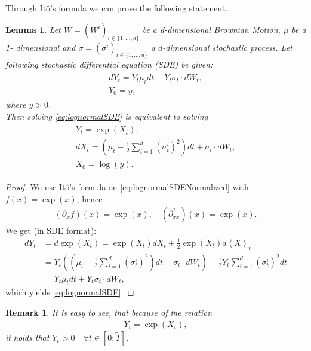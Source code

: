 \documentclass[12pt]{article}
\newtheorem{lemma}[theorem]{Lemma}
\newtheorem{remark}[theorem]{Remark}
\begin{document}
	Through Itô's formula we can prove the following statement.
	\begin{lemma}\label{lm:logNormalDyn}
		Let $W=(W^i)_{i\in \{1, ..., d\}}$ be a d-dimensional Brownian Motion, $\mu$ be a 1- dimensional and $\sigma = (\sigma^i)_{i\in \{1, ..., d\}}$ a $d$-dimensional stochastic process. Let following stochastic differential equation (SDE) be given:
		\begin{align}\label{eq:lognormalSDE}
			\begin{aligned}
				dY_t = Y_t \mu_t dt + Y_t \sigma_t \cdot dW_t,\\
				Y_0 = y,
			\end{aligned}
		\end{align}
		where $y > 0$.\\
		Then solving \cref{eq:lognormalSDE} is equivalent to solving
		\begin{align}\label{eq:lognormalSDENormalized}
			\begin{aligned}
				Y_t = \exp(X_t),\\
				dX_t = (\mu_t - \frac{1}{2}\sum_{i=1}^{d}(\sigma^i_t)^2)dt + \sigma_t \cdot dW_t,\\
				X_0 = \log(y).
			\end{aligned}
		\end{align}
	\end{lemma}
	\begin{proof}
		We use Itô's formula on \cref{eq:lognormalSDENormalized} with $f(x) = \exp(x)$, hence 
		\begin{align*}
			(\partial_xf)(x) = \exp(x), \quad (\partial^2_{xx})(x) = \exp(x).
		\end{align*}
		We get (in SDE format):
		\begin{align*}
			dY_t &= d\exp(X_t) = \exp(X_t)dX_t + \frac{1}{2}\exp(X_t)d\left\langle X \right\rangle_t\\
			&=	Y_t((\mu_t -\frac{1}{2}\sum_{i=1}^{d}(\sigma^i_t)^2)dt + \sigma_t \cdot dW_t) + \frac{1}{2}Y_t \sum_{i=1}^{d}(\sigma^i_t)^2 dt\\
			&= Y_t \mu_t dt + Y_t \sigma_t \cdot dW_t,
		\end{align*}
		which yields \cref{eq:lognormalSDE}.
	\end{proof}
	\begin{remark}
		It is easy to see, that because of the relation 
		\begin{align*}
			Y_t = \exp(X_t),
		\end{align*}
		it holds that $Y_t > 0 \quad \forall t \in [0;\tilde{T}]$.
	\end{remark}
	
\end{document}
